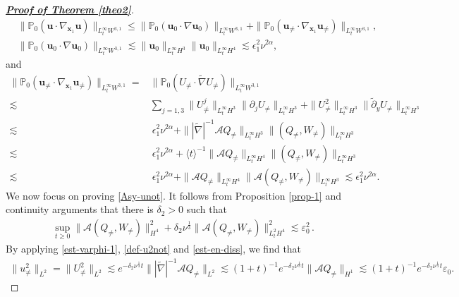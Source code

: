 \documentclass[11pt,reqno]{article}
\numberwithin{equation}{section}
\newcommand\A{\mathcal{A}}
\newcommand\x{\bm{x}}
\newcommand\uu{\bm{u}}
\let\na=\nabla
\let\al=\alpha
\let\var=\varepsilon
\let\f=\frac
\let\ep=\epsilon
\begin{document}
\begin{proof}[\textbf{\underline{Proof of Theorem \ref{theo2}}}]
\begin{align*}
    &\|\mathbb{P}_0(\uu\cdot\na_{\x_1}\uu)\|_{L^{\infty}_tW^{3,1}}\leq \|\mathbb{P}_0(\uu_0\cdot\na\uu_0)\|_{L^{\infty}_tW^{3,1}}+\|\mathbb{P}_0(\uu_{\neq}\cdot\na_{\x_1}\uu_{\neq})\|_{L^{\infty}_tW^{3,1}},\\
    &\|\mathbb{P}_0(\uu_0\cdot\na\uu_0)\|_{L^{\infty}_tW^{3,1}}\lesssim\|\uu_0\|_{L^{\infty}_tH^3}\|\uu_0\|_{L^{\infty}_tH^4}
    \lesssim\ep_1^2\nu^{2\al},
    \end{align*}
and
    \begin{align*}
    \|\mathbb{P}_0(\uu_{\neq}\cdot\na_{\x_1}\uu_{\neq})\|_{L^{\infty}_tW^{3,1}}=&
    \|\mathbb{P}_0(U_{\neq}\cdot\widetilde{\na}U_{\neq})\|_{L^{\infty}_tW^{3,1}}\\ 
    \lesssim&\sum_{j=1,3}
    \|U_{\neq}^j\|_{L^{\infty}_{t}H^3}\|\partial_jU_{\neq}\|_{L^{\infty}_tH^{3}}+
    \|U_{\neq}^2\|_{L^{\infty}_{t}H^3}\|\tilde{\partial}_yU_{\neq}\|_{L^{\infty}_tH^{3}}
  \\ \lesssim&~ \ep_1^2\nu^{2\al}+\||\widetilde{\na}|^{-1} \A Q_{\not=}\|_{L^{\infty}_{t}H^3}
    \| (Q_{\not=},W_{\not=})\|_{L^{\infty}_{t}H^3}\\ \lesssim& ~\ep_1^2\nu^{2\al}+\langle t\rangle^{-1}\| \A Q_{\not=}\|_{L^{\infty}_{t}H^4}
    \| (Q_{\not=},W_{\not=})\|_{L^{\infty}_{t}H^3}\\ \lesssim& ~\ep_1^2\nu^{2\al}+\| \A Q_{\not=}\|_{L^{\infty}_{t}H^4}
    \| \A(Q_{\not=},W_{\not=})\|_{L^{\infty}_{t}H^3}\lesssim \ep_1^2\nu^{2\al}.
\end{align*}
We now focus on proving \eqref{Asy-unot}.
It follows from Proposition \ref{prop-1} and continuity arguments that there is $\delta_2>0$ such that
\begin{align}\label{est-en-diss}
\sup_{t\geq 0}\|\A(Q_{\not=},W_{\not=})\|_{H^4}^2+\delta_2\nu^{\f13}\|\A(Q_{\not=},W_{\not=})\|_{L_t^2H^4}^2\lesssim \varepsilon_0^2\,.
\end{align}
By applying \eqref{est-varphi-1}, \eqref{def-u2not} and \eqref{est-en-diss}, we find that
\begin{align}\label{est-u2}
	\|u^2_{\not=}\|_{L^2}
	=\|U^2_{\not=}\|_{L^2}
	\lesssim e^{-\delta_2\nu^{\f13}t}\||\widetilde{\nabla}|^{-1}\A Q_{\not=}\|_{L^2}
	\lesssim (1+t)^{-1}e^{-\delta_2\nu^{\f13}t} \|\A Q_{\not=}\|_{H^1}
	\lesssim (1+t)^{-1} e^{-\delta_2\nu^{\f13}t}\var_0.

\end{align}
\end{proof}
\end{document}
